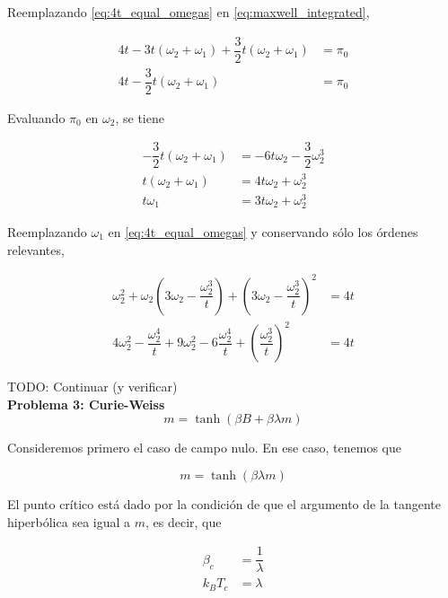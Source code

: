 \documentclass[10pt]{article}
\begin{document}
Reemplazando \ref{eq:4t_equal_omegas} en \ref{eq:maxwell_integrated},

\begin{align}
4t - 3t(\omega_2 + \omega_1) + \dfrac{3}{2} t (\omega_2 + \omega_1) &= \pi_0 \nonumber \\
4t - \dfrac{3}{2} t (\omega_2 + \omega_1) &= \pi_0
\end{align}

Evaluando $\pi_0$ en $\omega_2$, se tiene

\begin{align}
 -\dfrac{3}{2} t (\omega_2 + \omega_1) &= -6t\omega_2 -\dfrac{3}{2}\omega_2^3 \nonumber \\
t (\omega_2 + \omega_1) &= 4t\omega_2 + \omega_2^3 \nonumber \\
t \omega_1  &= 3 t \omega_2 + \omega_2^3 \nonumber \label{eq:t_omega1}
\end{align}

Reemplazando $\omega_1$ en  \ref{eq:4t_equal_omegas} y conservando s\'olo los \'ordenes relevantes,

\begin{align}
  \omega_2^2+\omega_2 \left( 3 \omega_2 - \dfrac{\omega_2^3}{t} \right) + \left(3 \omega_2 - \dfrac{\omega_2^3}{t} \right)^2 &= 4t \nonumber \\
  4 \omega_2^2 - \dfrac{\omega_2^4}{t} + 9 \omega_2^2 - 6 \dfrac{\omega_2^4}{t} + \left( \dfrac{\omega_2^3}{t} \right)^2 &= 4t 
\end{align}

TODO: Continuar (y verificar)
\\

\textbf{Problema 3: Curie-Weiss}
\\

\begin{equation} \label{eq:Curie_Weiss}
m = \tanh (\beta B + \beta \lambda m)
\end{equation}

Consideremos primero el caso de campo nulo. En ese caso, tenemos que 

\begin{equation} \label{eq:Curie_Weiss_B0}
m = \tanh (\beta \lambda m)
\end{equation}

El punto cr\'itico est\'a dado por la condici\'on de que el argumento de la tangente hiperb\'olica sea igual a $m$, es decir, que

\begin{align}
\beta_c &= \dfrac{1}{\lambda} \nonumber \\
k_B T_c &= \lambda \nonumber
\end{align}
\end{document}

